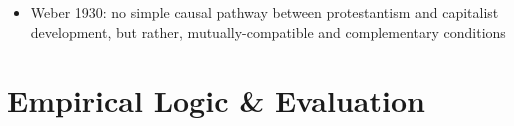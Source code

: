 \documentclass[12pt]{article}
\begin{document}
\begin{itemize}
\begin{itemize}
\begin{itemize}
            \item Przeworski et al 2000: democracies are less likely to survive stagnant economies, so the democracies we observe tend to be economically developed as a survivorship effect rather than a true causal effect
        \end{itemize}
    \end{itemize}
    \item Weber 1930: no simple causal pathway between protestantism and capitalist development, but rather, mutually-compatible and complementary conditions
\end{itemize}





\section*{Empirical Logic \& Evaluation}
\end{document}
